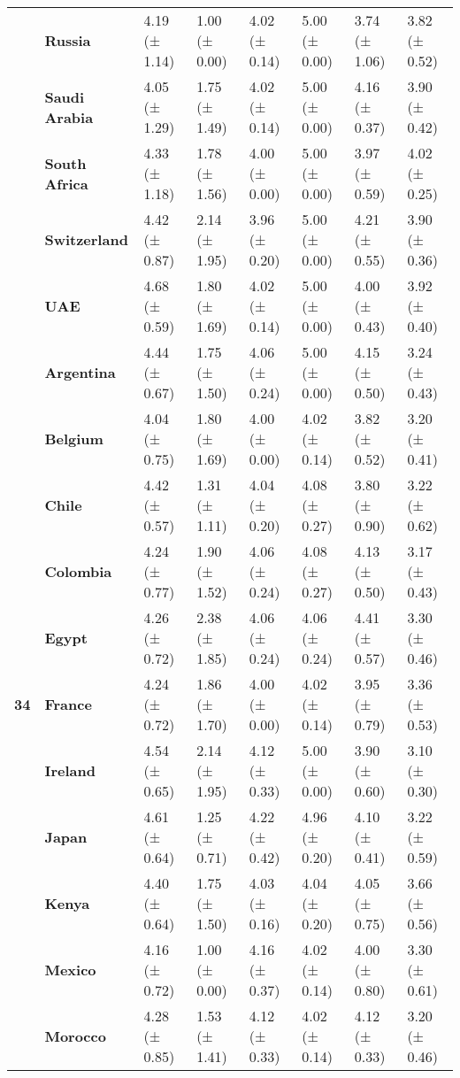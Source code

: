 \begin{tabular}{llllllll}
\textbf{} & \textbf{Russia} & 4.19 (± 1.14) & 1.00 (± 0.00) & 4.02 (± 0.14) & 5.00 (± 0.00) & 3.74 (± 1.06) & 3.82 (± 0.52) \\
\textbf{} & \textbf{Saudi Arabia} & 4.05 (± 1.29) & 1.75 (± 1.49) & 4.02 (± 0.14) & 5.00 (± 0.00) & 4.16 (± 0.37) & 3.90 (± 0.42) \\
\textbf{} & \textbf{South Africa} & 4.33 (± 1.18) & 1.78 (± 1.56) & 4.00 (± 0.00) & 5.00 (± 0.00) & 3.97 (± 0.59) & 4.02 (± 0.25) \\
\textbf{} & \textbf{Switzerland} & 4.42 (± 0.87) & 2.14 (± 1.95) & 3.96 (± 0.20) & 5.00 (± 0.00) & 4.21 (± 0.55) & 3.90 (± 0.36) \\
\textbf{} & \textbf{UAE} & 4.68 (± 0.59) & 1.80 (± 1.69) & 4.02 (± 0.14) & 5.00 (± 0.00) & 4.00 (± 0.43) & 3.92 (± 0.40) \\
\cline{1-8}
\multirow[t]{19}{*}{\textbf{34}} & \textbf{Argentina} & 4.44 (± 0.67) & 1.75 (± 1.50) & 4.06 (± 0.24) & 5.00 (± 0.00) & 4.15 (± 0.50) & 3.24 (± 0.43) \\
\textbf{} & \textbf{Belgium} & 4.04 (± 0.75) & 1.80 (± 1.69) & 4.00 (± 0.00) & 4.02 (± 0.14) & 3.82 (± 0.52) & 3.20 (± 0.41) \\
\textbf{} & \textbf{Chile} & 4.42 (± 0.57) & 1.31 (± 1.11) & 4.04 (± 0.20) & 4.08 (± 0.27) & 3.80 (± 0.90) & 3.22 (± 0.62) \\
\textbf{} & \textbf{Colombia} & 4.24 (± 0.77) & 1.90 (± 1.52) & 4.06 (± 0.24) & 4.08 (± 0.27) & 4.13 (± 0.50) & 3.17 (± 0.43) \\
\textbf{} & \textbf{Egypt} & 4.26 (± 0.72) & 2.38 (± 1.85) & 4.06 (± 0.24) & 4.06 (± 0.24) & 4.41 (± 0.57) & 3.30 (± 0.46) \\
\textbf{} & \textbf{France} & 4.24 (± 0.72) & 1.86 (± 1.70) & 4.00 (± 0.00) & 4.02 (± 0.14) & 3.95 (± 0.79) & 3.36 (± 0.53) \\
\textbf{} & \textbf{Ireland} & 4.54 (± 0.65) & 2.14 (± 1.95) & 4.12 (± 0.33) & 5.00 (± 0.00) & 3.90 (± 0.60) & 3.10 (± 0.30) \\
\textbf{} & \textbf{Japan} & 4.61 (± 0.64) & 1.25 (± 0.71) & 4.22 (± 0.42) & 4.96 (± 0.20) & 4.10 (± 0.41) & 3.22 (± 0.59) \\
\textbf{} & \textbf{Kenya} & 4.40 (± 0.64) & 1.75 (± 1.50) & 4.03 (± 0.16) & 4.04 (± 0.20) & 4.05 (± 0.75) & 3.66 (± 0.56) \\
\textbf{} & \textbf{Mexico} & 4.16 (± 0.72) & 1.00 (± 0.00) & 4.16 (± 0.37) & 4.02 (± 0.14) & 4.00 (± 0.80) & 3.30 (± 0.61) \\
\textbf{} & \textbf{Morocco} & 4.28 (± 0.85) & 1.53 (± 1.41) & 4.12 (± 0.33) & 4.02 (± 0.14) & 4.12 (± 0.33) & 3.20 (± 0.46) \\

\end{tabular}
